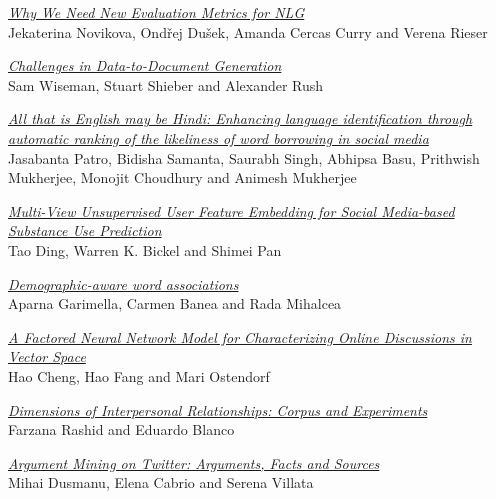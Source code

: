 \hyperlink{page.2224}{\em Why We Need New Evaluation Metrics for NLG}\samepage \\
\hspace*{7mm} Jekaterina Novikova, Ond\v{r}ej Du\v{s}ek, Amanda Cercas Curry and Verena Rieser\dotfill {}

\hyperlink{page.2236}{\em Challenges in Data-to-Document Generation}\samepage \\
\hspace*{7mm} Sam Wiseman, Stuart Shieber and Alexander Rush\dotfill {}

\hyperlink{page.2247}{\em All that is English may be Hindi: Enhancing language identification through automatic ranking of the likeliness of word borrowing in social media}\samepage \\
\hspace*{7mm} Jasabanta Patro, Bidisha Samanta, Saurabh Singh, Abhipsa Basu, Prithwish Mukherjee, Monojit Choudhury and Animesh Mukherjee\dotfill {}

\hyperlink{page.2258}{\em Multi-View Unsupervised User Feature Embedding for Social Media-based Substance Use Prediction}\samepage \\
\hspace*{7mm} Tao Ding, Warren K. Bickel and Shimei Pan\dotfill {}

\hyperlink{page.2268}{\em Demographic-aware word associations}\samepage \\
\hspace*{7mm} Aparna Garimella, Carmen Banea and Rada Mihalcea\dotfill {}

\hyperlink{page.2279}{\em A Factored Neural Network Model for Characterizing Online Discussions in Vector Space}\samepage \\
\hspace*{7mm} Hao Cheng, Hao Fang and Mari Ostendorf\dotfill {}

\hyperlink{page.2290}{\em Dimensions of Interpersonal Relationships: Corpus and Experiments}\samepage \\
\hspace*{7mm} Farzana Rashid and Eduardo Blanco\dotfill {}

\hyperlink{page.2300}{\em Argument Mining on Twitter: Arguments, Facts and Sources}\samepage \\
\hspace*{7mm} Mihai Dusmanu, Elena Cabrio and Serena Villata\dotfill {}

